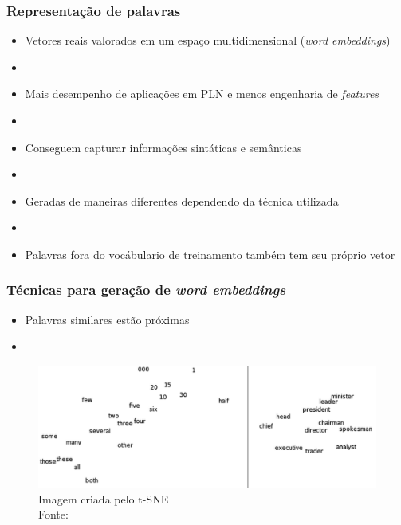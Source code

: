 \documentclass[10pt]{beamer}
\begin{document}
\begin{frame}[fragile]
  \frametitle{Representação de palavras}

  \begin{itemize}

    \item Vetores reais valorados em um espaço multidimensional (\textit{word embeddings})
    
    \item[\ ] \ 

    \item Mais desempenho de aplicações em PLN e menos engenharia de \textit{features}

    \item[\ ] \ 

    \item Conseguem capturar informações sintáticas e semânticas

    \item[\ ] \ 

    \item Geradas de maneiras diferentes dependendo da técnica utilizada


    \item[\ ] \ 

    \item Palavras fora do vocábulario de treinamento também tem seu próprio vetor


  \end{itemize}
  


\end{frame}



\begin{frame}[fragile]
  \frametitle{Técnicas para geração de \textit{word embeddings}}

   \begin{itemize}
    \item Palavras similares estão próximas
    \item[\ ] \ 
  \end{itemize}

  \begin{figure}[htb]
  \begin{center}
      \includegraphics[scale=0.18]{img/Turian-WordTSNE}
  \end{center}
  \caption{Imagem criada pelo t-SNE\\Fonte: }

\end{figure}


\end{frame}
\end{document}
